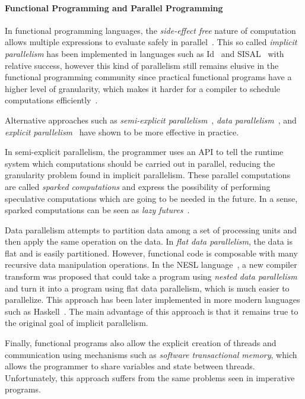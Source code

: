 \paragraph{Functional Programming and Parallel Programming}

In functional programming languages, the \emph{side-effect free} nature of
computation allows multiple expressions to evaluate safely in
parallel~\cite{Loidl:2003}. This so called \emph{implicit parallelism} has been
implemented in languages such as Id~\cite{Nikhil93anoverview} and
SISAL~\cite{gaudiot2001sisal} with relative success, however this kind of parallelism
still remains elusive in the functional programming community since practical
functional programs have a higher level of granularity, which makes it harder
for a compiler to schedule computations efficiently~\cite{haskell_tutorial}.

Alternative approaches such as \emph{semi-explicit
parallelism}~\cite{Marlow:2010}, \emph{data
parallelism}~\cite{Blelloch:1996:PPA:227234.227246}, and \emph{explicit
parallelism}~\cite{harris2005composable} have shown to be more
effective in practice.

In semi-explicit parallelism, the programmer uses an API to tell the runtime
system which computations should be carried out in parallel, reducing the
granularity problem found in implicit parallelism. These parallel computations
are called \emph{sparked computations} and express the possibility of performing
speculative computations which are going to be needed in the future. In a sense,
sparked computations can be seen as \emph{lazy futures}~\cite{Baker:1977}.

Data parallelism attempts to partition data among a set of processing units and
then apply the same operation on the data.  In \emph{flat data parallelism}, the
data is flat and is easily partitioned.  However, functional code is composable
with many recursive data manipulation operations. In the NESL
language~\cite{Blelloch:1996:PPA:227234.227246}, a new compiler transform was
proposed that could take a program using \emph{nested data parallelism} and turn
it into a program using flat data parallelism, which is much easier to
parallelize. This approach has been later implemented in more modern languages
such as Haskell~\cite{Chakravarty07dataparallel}. The main advantage of this
approach is that it remains true to the original goal of implicit parallelism.

Finally, functional programs also allow the explicit creation of threads and
communication using mechanisms such as \emph{software transactional memory},
which allows the programmer to share variables and state between threads.
Unfortunately, this approach suffers from the same problems seen in imperative
programs.


